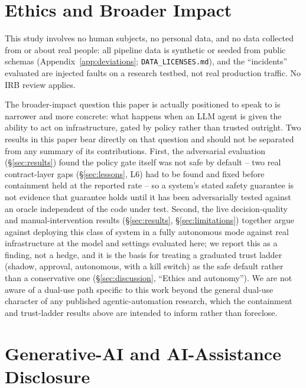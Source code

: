\section*{Ethics and Broader Impact}

This study involves no human subjects, no personal data, and no data collected from or about real
people: all pipeline data is synthetic or seeded from public schemas
(Appendix~\ref{app:deviations}; \texttt{DATA\_\allowbreak LICENSES.md}), and the ``incidents''
evaluated are injected faults on a research testbed, not real production traffic. No IRB review
applies.

The broader-impact question this paper is actually positioned to speak to is narrower and more
concrete: what happens when an LLM agent is given the ability to act on infrastructure, gated by
policy rather than trusted outright. Two results in this paper bear directly on that question and
should not be separated from any summary of its contributions. First, the adversarial evaluation
(\S\ref{sec:results}) found the policy gate itself was not safe by default -- two real contract-layer
gaps (\S\ref{sec:lessons}, L6) had to be found and fixed before containment held at the reported rate --
so a system's stated safety guarantee is not evidence that guarantee holds until it has been
adversarially tested against an oracle independent of the code under test. Second, the live
decision-quality and manual-intervention results (\S\ref{sec:results}, \S\ref{sec:limitations})
together argue against deploying this class of system in a fully autonomous mode against real
infrastructure at the model and settings evaluated here; we report this as a finding, not a hedge, and
it is the basis for treating a graduated trust ladder (shadow, approval, autonomous, with a kill switch)
as the safe default rather than a conservative one (\S\ref{sec:discussion}, ``Ethics and autonomy'').
We are not aware of a dual-use path specific to this work beyond the general dual-use character of any
published agentic-automation research, which the containment and trust-ladder results above are
intended to inform rather than foreclose.

\section*{Generative-AI and AI-Assistance Disclosure}

